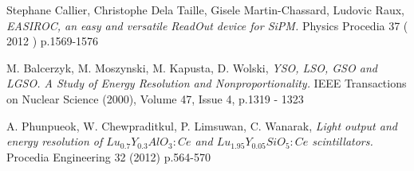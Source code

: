 \documentclass{JINST}
\begin{document}
\begin{thebibliography}{99}
Stephane Callier, Christophe Dela Taille, Gisele Martin-Chassard, Ludovic Raux, \emph{EASIROC, an easy and versatile ReadOut device for SiPM.} Physics Procedia 37 ( 2012 ) p.1569-1576

M. Balcerzyk, M. Moszynski, M. Kapusta, D. Wolski, \emph{YSO, LSO, GSO and LGSO. A Study of Energy Resolution and Nonproportionality.} IEEE Transactions on Nuclear Science (2000), Volume 47, Issue 4, p.1319 - 1323

A. Phunpueok, W. Chewpraditkul, P. Limsuwan, C. Wanarak, \emph{Light output and energy resolution of $Lu_{0.7}Y_{0.3}AlO_{3}:Ce$ and
$Lu_{1.95}Y_{0.05}SiO_{5}:Ce$ scintillators.} Procedia Engineering 32 (2012) p.564-570



\end{thebibliography}
\end{document}
